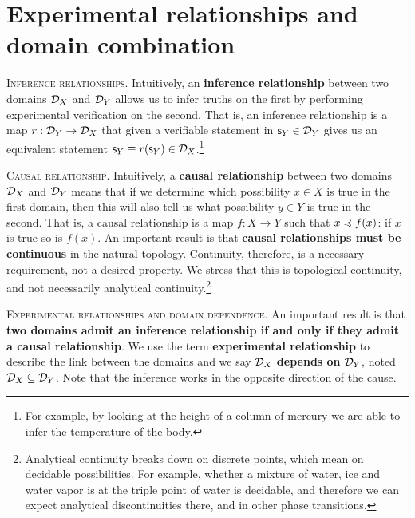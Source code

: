 \documentclass[10pt,twocolumn, nofootinbib]{revtex4-1}
\newcommand\partitle[1]{\textsc{#1}.}
\begin{document}
\section{Experimental relationships and domain combination}

\partitle{Inference relationships} Intuitively, an \textbf{ inference relationship} between two domains $\mathcal{D}_X$ and $\mathcal{D}_Y$ allows us to infer truths on the first by performing experimental verification on the second. That is, an inference relationship is a map $r : \mathcal{D}_Y \to \mathcal{D}_X$ that given a verifiable statement in $\mathsf{s}_Y \in \mathcal{D}_Y$ gives us an equivalent statement $\mathsf{s}_Y \equiv r(\mathsf{s}_Y) \in \mathcal{D}_X$.\footnote{For example, by looking at the height of a column of mercury we are able to infer the temperature of the body.}

\partitle{Causal relationship} Intuitively, a \textbf{causal relationship} between two domains $\mathcal{D}_X$ and $\mathcal{D}_Y$ means that if we determine which possibility $x \in X$ is true in the first domain, then this will also tell us what possibility $y \in Y$ is true in the second. That is, a causal relationship is a map $f : X \to Y$ such that $x \preccurlyeq f(x)$: if $x$ is true so is $f(x)$. An important result is that \textbf{causal relationships must be continuous} in the natural topology. Continuity, therefore, is a necessary requirement, not a desired property. We stress that this is topological continuity, and not necessarily analytical continuity.\footnote{Analytical continuity breaks down on discrete points, which mean on decidable possibilities. For example, whether a mixture of water, ice and water vapor is at the triple point of water is decidable, and therefore we can expect analytical discontinuities there, and in other phase transitions.}

\partitle{Experimental relationships and domain dependence} An important result is that \textbf{two domains admit an inference relationship if and only if they admit a causal relationship}. We use the term \textbf{experimental relationship} to describe the link between the domains and we say $\mathcal{D}_X$ \textbf{depends on} $\mathcal{D}_Y$, noted $\mathcal{D}_X \subseteq \mathcal{D}_Y$. Note that the inference works in the opposite direction of the cause.
\end{document}
